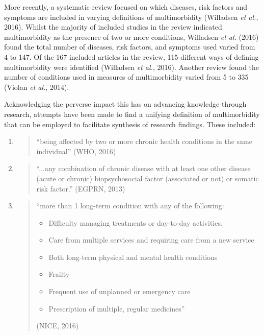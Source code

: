 \documentclass[12pt,a4paper,oneside,table]{report}
\begin{document}
More recently, a systematic review focused on which diseases, risk
factors and symptoms are included in varying definitions of
multimorbidity (Willadsen \emph{et al.}, 2016). Whilst the majority of
included studies in the review indicated multimorbidity as the presence
of two or more conditions, Willadsen \textit{et al.} (2016) found the
total number of diseases, risk factors, and symptoms used varied from 4
to 147. Of the 167 included articles in the review, 115 different ways
of defining multimorbidity were identified (Willadsen \emph{et al.},
2016). Another review found the number of conditions used in measures of
multimorbidity varied from 5 to 335 (Violan \emph{et al.}, 2014).

Acknowledging the perverse impact this has on advancing knowledge
through research, attempts have been made to find a unifying definition
of multimorbidity that can be employed to facilitate synthesis of
research findings. These included:

\begin{enumerate}[noitemsep]

\item \begin{quotation} ``being affected by two or more chronic health conditions in the same individual'' \hfill (WHO, 2016) \end{quotation} 

\item \begin{quotation} ``...any combination of chronic disease with at least one other disease (acute or chronic) biopsychosocial factor (associated or not) or somatic risk factor.'' \hfill (EGPRN, 2013) \end{quotation} 

\item \begin{quotation} ``more than 1 long-term condition with any of the following: \begin{itemize}[noitemsep] \item Difficulty managing treatments or day-to-day activities. \item Care from multiple services and requiring care from a new service \item Both long-term physical and mental health conditions \item Frailty \item Frequent use of unplanned or emergency care \item Prescription of multiple, regular medicines'' \end{itemize} \hfill(NICE, 2016) \end{quotation} 
\end{enumerate}
\end{document}
